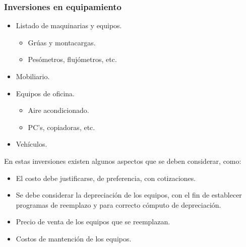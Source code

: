 \documentclass{templateNote}
\begin{document}
\subsubsection{Inversiones en equipamiento}
\vspace{0.5cm}
\begin{minipage}[H]{0.45\textwidth}
    \begin{itemize}
        \item Listado de maquinarias y equipos.
        \begin{itemize}
            \item Grúas y montacargas.
            \item Pesómetros, flujómetros, etc.
        \end{itemize}
        \item Mobiliario.
    \end{itemize}
\end{minipage}
\hfill
\begin{minipage}[H]{0.45\textwidth}
    \begin{itemize}
        \item Equipos de oficina.
        \begin{itemize}
            \item Aire acondicionado.
            \item PC's, copiadoras, etc.
        \end{itemize}
        \item Vehículos.
    \end{itemize}
\end{minipage}

En estas inversiones existen algunos aspectos que se deben considerar, como:
\begin{itemize}
    \item El costo debe justificarse, de preferencia, con cotizaciones.
    \item Se debe considerar la depreciación de los equipos, con el fin de establecer programas de reemplazo y para correcto cómputo de depreciación.
    \item Precio de venta de los equipos que se reemplazan.
    \item Costos de mantención de los equipos. 
\end{itemize}
\end{document}

